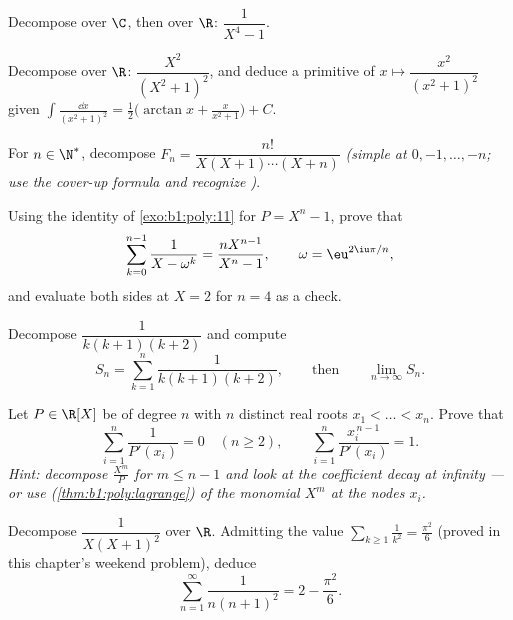 \begin{exercise}[$\star\star$]\label{exo:b1:fractions:4}
Decompose over $\C$, then over $\R$: $\dfrac{1}{X^4 - 1}$.
\end{exercise}

\begin{exercise}[$\star\star$]\label{exo:b1:fractions:5}
Decompose over $\R$: $\dfrac{X^2}{(X^2 + 1)^2}$, and deduce a
primitive of $x \mapsto \dfrac{x^2}{(x^2+1)^2}$ given
$\int \frac{\dd x}{(x^2+1)^2} = \frac12\bigl(\arctan x +
\frac{x}{x^2+1}\bigr) + C$.
\end{exercise}

\begin{exercise}[$\star\star$]\label{exo:b1:fractions:6}
For $n \in \N^*$, decompose $F_n = \dfrac{n!}{X(X+1)\cdots(X+n)}$
\emph{(simple  at $0, -1, \dots, -n$; use the cover-up formula
and recognize )}.
\end{exercise}

\begin{exercise}[$\star\star$]\label{exo:b1:fractions:7}
Using the identity of \cref{exo:b1:poly:11} for $P = X^n - 1$,
prove that
\[
\sum_{k=0}^{n-1} \frac{1}{X - \omega^k} = \frac{n X^{n-1}}{X^n - 1},
\qquad \omega = \eu^{2\iu\pi/n},
\]
and evaluate both sides at $X = 2$ for $n = 4$ as a check.
\end{exercise}

\begin{exercise}[$\star\star$]\label{exo:b1:fractions:8}
Decompose $\dfrac{1}{k(k+1)(k+2)}$ and compute
\[
S_n = \sum_{k=1}^{n} \frac{1}{k(k+1)(k+2)},
\qquad\text{then}\qquad
\lim_{n \to \infty} S_n .
\]
\end{exercise}

\begin{exercise}[$\star\star\star$]\label{exo:b1:fractions:9}
Let $P \in \R[X]$ be  of degree $n$ with $n$ distinct real roots
$x_1 < \dots < x_n$. Prove that
\[
\sum_{i=1}^{n} \frac{1}{P'(x_i)} = 0 \quad (n \geq 2),
\qquad
\sum_{i=1}^{n} \frac{x_i^{\,n-1}}{P'(x_i)} = 1 .
\]
\emph{Hint: decompose $\frac{X^m}{P}$ for $m \leq n - 1$ and look at
the coefficient decay at infinity --- or use 
(\cref{thm:b1:poly:lagrange}) of the monomial $X^m$ at the nodes
$x_i$.}
\end{exercise}

\begin{exercise}[$\star\star$]\label{exo:b1:fractions:10}
Decompose $\dfrac{1}{X(X+1)^2}$ over $\R$. Admitting the value
$\sum_{k \geq 1} \frac1{k^2} = \frac{\pi^2}6$ (proved in this
chapter's weekend problem), deduce
\[
\sum_{n=1}^{\infty} \frac{1}{n(n+1)^2} = 2 - \frac{\pi^2}{6} .
\]
\end{exercise}

